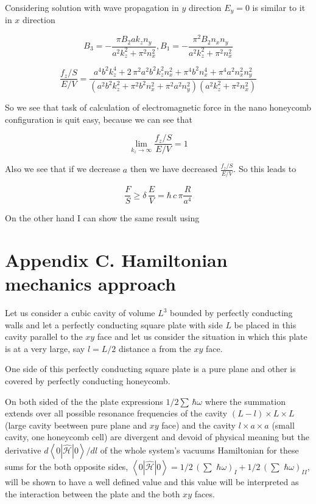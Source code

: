 \documentclass[11pt]{article}
\begin{document}
Considering solution with wave propagation in \(y\) direction
\(E_y = 0\) is similar to it in \(x\) direction

    \[B_3 = -\frac{\pi B_{2} a k_{z} n_{y}}{a^{2} k_{z}^{2} + \pi^{2} n_{x}^{2}}, 
B_1 = -\frac{\pi^{2} B_{2} n_{x} n_{y}}{a^{2} k_{z}^{2} + \pi^{2} n_{x}^{2}}\]

\[\frac{f_z/S}{E/V} = \frac{a^{4} b^{2} k_{z}^{4} + 2 \, \pi^{2} a^{2} b^{2} k_{z}^{2} n_{x}^{2} + \pi^{4} b^{2} n_{x}^{4} + \pi^{4} a^{2} n_{x}^{2} n_{y}^{2}}{{\left(a^{2} b^{2} k_{z}^{2} + \pi^{2} b^{2} n_{x}^{2} + \pi^{2} a^{2} n_{y}^{2}\right)} {\left(a^{2} k_{z}^{2} + \pi^{2} n_{x}^{2}\right)}}\]

    So we see that task of calculation of electromagnetic force in the nano
honeycomb configuration is quit easy, because we can see that

\[\lim_{k_z \to \infty}\frac{f_z/S}{E/V} = 1\]

Also we see that if we decrease \(a\) then we have decreased
\(\frac{f_z/S}{E/V}\). So this leads to

\[\frac{F}{S} \geq \delta\,\frac{E}{V} = \hbar\,c\, \pi\frac{R}{a^4}\]

On the other hand I can show the same result using

    \section{Appendix C. Hamiltonian mechanics
approach}\label{appendix-c.-hamiltonian-mechanics-approach}

    Let us consider a cubic cavity of volume \(L^3\) bounded by perfectly
conducting walls and let a perfectly conducting square plate with side
\(L\) be placed in this cavity parallel to the \(xy\) face and let us
consider the situation in which this plate is at a very large, say
\(l = L/2\) distance a from the \(xy\) face.

One side of this perfectly conducting square plate is a pure plane and
other is covered by perfectly conducting honeycomb.

On both sided of the the plate expressions \(1\big/2\sum\,\hbar\omega\)
where the summation extends over all possible resonance frequencies of
the cavity \(\left(L-l\right)\times L\times L\) (large cavity beetween
pure plane and \(xy\) face) and the cavity \(l\times a\times a\) (small
cavity, one honeycomb cell) are divergent and devoid of physical meaning
but the derivative \({d\left<0|\hat{\mathcal{H}}|0\right>}\big/{dl}\) of
the whole system's vacuums Hamiltonian for these sums for the both
opposite sides,
\(\left<0|\hat{\mathcal{H}}|0\right> = 1\big/2\,\left(\sum\,\,\hbar\omega\right)_{I} + 1\big/2\,\left(\sum\,\,\hbar\omega\right)_{II}\),
will be shown to have a well defined value and this value will be
interpreted as the interaction between the plate and the both \(xy\)
faces.
\end{document}
